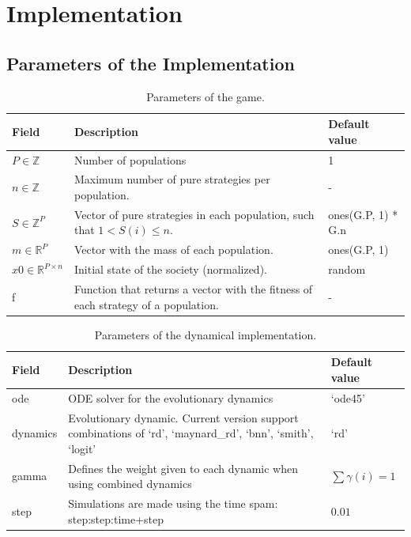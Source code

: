 \section{Implementation} \label{sec:implementation}

\subsection{Parameters of the Implementation}


\begin{table}[tbh]
\begin{center}
\begin{tabular}{l | p{} | l}\hline
Field & Description & Default value\\ \hline
$P\in\mathbb{Z}$ & Number of populations & 1 \\
$n\in\mathbb{Z}$ & Maximum number of pure strategies per population. & - \\
$S\in\mathbb{Z}^{P}$ & Vector of pure strategies in each population, such that $1<S(i)\leq n$. & ones(G.P, 1) * G.n \\
$m\in\mathbb{R}^P$ & Vector with the mass of each population. & ones(G.P, 1) \\
$x0\in\mathbb{R}^{P\times n}$ & Initial state of the society (normalized). & random \\
f & Function that returns a vector with the fitness of each strategy of a population. & - \\ \hline
\end{tabular}
\end{center}
\caption{Parameters of the game.}
\label{tab:game}
\end{table}



\begin{table}[tbh]
\begin{center}
\begin{tabular}{l | p{} | l}\hline
Field & Description & Default value\\ \hline
ode & ODE solver for the evolutionary dynamics & `ode45' \\
dynamics & Evolutionary dynamic. Current version support combinations of {`rd', `maynard\_rd',  `bnn', `smith',  `logit'} & `rd' \\
gamma & Defines the weight given to each dynamic when using combined dynamics &  $\sum \gamma(i) = 1$ \\
step & Simulations are made using the time spam: step:step:time+step & $0.01$ \\
\hline
\end{tabular}
\end{center}
\caption{Parameters of the dynamical implementation.}
\label{tab:req_a}
\end{table}




